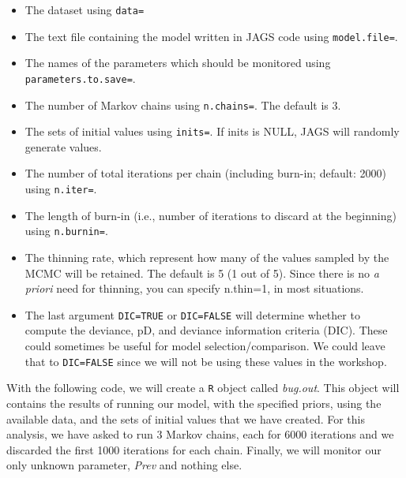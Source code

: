 \documentclass[
]{book}
\providecommand{\tightlist}{%
  \setlength{\itemsep}{0pt}\setlength{\parskip}{0pt}}
\begin{document}
\begin{itemize}
\tightlist
\item
  The dataset using \texttt{data=}\\
\item
  The text file containing the model written in JAGS code using
  \texttt{model.file=}.\\
\item
  The names of the parameters which should be monitored using
  \texttt{parameters.to.save=}.\\
\item
  The number of Markov chains using \texttt{n.chains=}. The default is
  3.\\
\item
  The sets of initial values using \texttt{inits=}. If inits is NULL,
  JAGS will randomly generate values.\\
\item
  The number of total iterations per chain (including burn-in; default:
  2000) using \texttt{n.iter=}.
\item
  The length of burn-in (i.e., number of iterations to discard at the
  beginning) using \texttt{n.burnin=}.
\item
  The thinning rate, which represent how many of the values sampled by
  the MCMC will be retained. The default is 5 (1 out of 5). Since there
  is no \emph{a priori} need for thinning, you can specify n.thin=1, in
  most situations.
\item
  The last argument \texttt{DIC=TRUE} or \texttt{DIC=FALSE} will
  determine whether to compute the deviance, pD, and deviance
  information criteria (DIC). These could sometimes be useful for model
  selection/comparison. We could leave that to \texttt{DIC=FALSE} since
  we will not be using these values in the workshop.
\end{itemize}

With the following code, we will create a \texttt{R} object called
\emph{bug.out}. This object will contains the results of running our
model, with the specified priors, using the available data, and the sets
of initial values that we have created. For this analysis, we have asked
to run 3 Markov chains, each for 6000 iterations and we discarded the
first 1000 iterations for each chain. Finally, we will monitor our only
unknown parameter, \emph{Prev} and nothing else.
\end{document}
